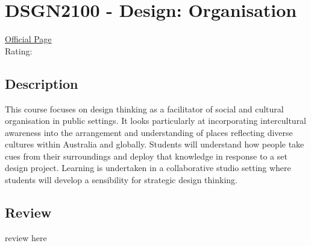 \hypertarget{DSGN2100}{\section{DSGN2100 - Design: Organisation}}

\large
\textcolor{turbo_purple}{\href{https://my.uq.edu.au/programs-courses/course.html?course_code=DSGN2100}{Official Page}} \\
Rating: \cstar\cstar\cstar\cstar\ostar

\normalsize
\subsection*{Description}
This course focuses on design thinking as a facilitator of social and cultural organisation in public settings.
It looks particularly at incorporating intercultural awareness into the arrangement and understanding of places reflecting diverse cultures within Australia and globally.
Students will understand how people take cues from their surroundings and deploy that knowledge in response to a set design project.
Learning is undertaken in a collaborative studio setting where students will develop a sensibility for strategic design thinking.

\subsection*{Review}
review here
